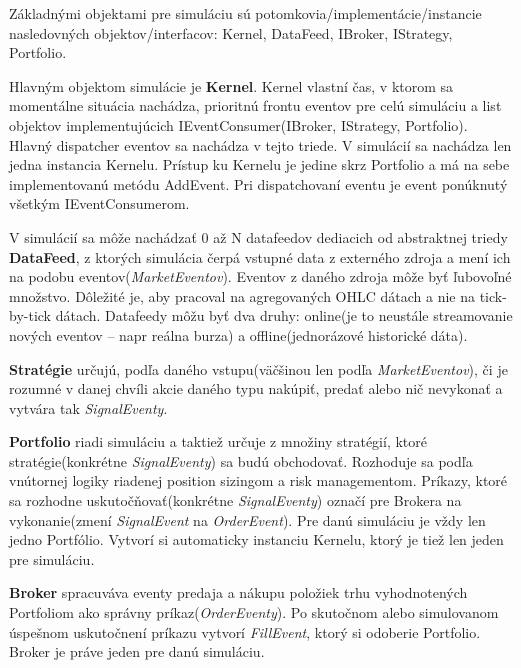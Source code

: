 \documentclass[a4paper]{article}
\begin{document}
Základnými objektami pre simuláciu sú potomkovia/implementácie/instancie nasledovných objektov/interfacov: Kernel, DataFeed, IBroker, IStrategy, Portfolio.

Hlavným objektom simulácie je \textbf{Kernel}. Kernel vlastní čas, v ktorom sa momentálne situácia nachádza, prioritnú frontu eventov pre celú simuláciu a list objektov implementujúcich IEventConsumer(IBroker, IStrategy, Portfolio). Hlavný dispatcher eventov sa nachádza v tejto triede. V simulácií sa nachádza len jedna instancia Kernelu. Prístup ku Kernelu je jedine skrz Portfolio a má na sebe implementovanú metódu AddEvent. Pri dispatchovaní eventu je event ponúknutý všetkým IEventConsumerom.

V simulácií sa môže nachádzať 0 až N datafeedov dediacich od abstraktnej triedy \textbf{DataFeed}, z ktorých simulácia čerpá vstupné data z externého zdroja a mení ich na podobu eventov(\textit{MarketEventov}). Eventov z daného zdroja môže byť ľubovoľné množstvo. Dôležité je, aby pracoval na agregovaných OHLC dátach a nie na tick-by-tick dátach. Datafeedy môžu byť dva druhy: online(je to neustále streamovanie nových eventov – napr reálna burza) a offline(jednorázové historické dáta).

\textbf{Stratégie} určujú, podľa daného vstupu(väčšinou len podľa \textit{MarketEventov}), či je rozumné v danej chvíli akcie daného typu nakúpiť, predať alebo nič nevykonať a vytvára tak \textit{SignalEventy}. 

\textbf{Portfolio} riadi simuláciu a taktiež určuje z množiny stratégií, ktoré stratégie(konkrétne \textit{SignalEventy}) sa budú obchodovať. Rozhoduje sa podľa vnútornej logiky riadenej position sizingom a risk managementom. Príkazy, ktoré sa rozhodne uskutočňovať(konkrétne \textit{SignalEventy}) označí pre Brokera na vykonanie(zmení \textit{SignalEvent} na \textit{OrderEvent}). Pre danú simuláciu je vždy len jedno Portfólio. Vytvorí si automaticky instanciu Kernelu, ktorý je tiež len jeden pre simuláciu.

\textbf{Broker} spracuváva eventy predaja a nákupu položiek trhu vyhodnotených Portfoliom ako správny príkaz(\textit{OrderEventy}). Po skutočnom alebo simulovanom úspešnom uskutočnení príkazu vytvorí \textit{FillEvent}, ktorý si odoberie Portfolio. Broker je práve jeden pre danú simuláciu.
\end{document}
